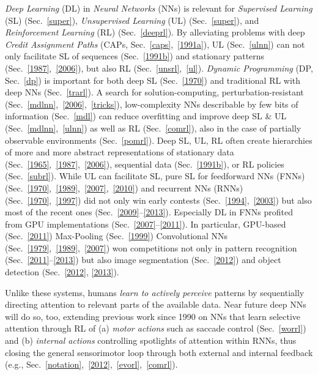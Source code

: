\documentclass[letterpaper]{article}
\begin{document}
\begin{CJK*}{UTF8}{gbsn}
{\em Deep Learning} (DL) in 
{\em Neural Networks} (NNs)
is relevant for
{\em Supervised Learning} (SL) (Sec.~\ref{super}),
{\em Unsupervised Learning} (UL) (Sec.~\ref{super}), and
{\em Reinforcement Learning} (RL) (Sec.~\ref{deeprl}).
By alleviating problems with deep {\em Credit Assignment Paths} (CAPs, Sec.~\ref{caps},~\ref{1991a}),
UL (Sec.~\ref{ulnn}) can not only facilitate 
SL of sequences  
(Sec.~\ref{1991b}) and 
stationary patterns
(Sec.~\ref{1987},~\ref{2006}), but also 
RL (Sec.~\ref{unsrl},~\ref{ul}). 
{\em Dynamic Programming} (DP, Sec.~\ref{dp}) is important for both 
deep SL (Sec.~\ref{1970})
and traditional RL with deep NNs (Sec.~\ref{trarl}).
A search for solution-computing, 
perturbation-resistant (Sec.~\ref{mdlnn},~\ref{2006},~\ref{tricks}),
low-complexity  NNs 
describable by few bits of information (Sec.~\ref{mdl}) can 
reduce overfitting and 
improve
deep SL \& UL (Sec.~\ref{mdlnn},~\ref{ulnn}) as well as RL (Sec.~\ref{comrl}),
also in the case of partially observable environments (Sec.~\ref{pomrl}). 
Deep SL, UL, RL often create hierarchies of more and more abstract  
representations of stationary data (Sec.~\ref{1965},~\ref{1987},~\ref{2006}),
sequential data (Sec.~\ref{1991b}), or RL policies (Sec.~\ref{subrl}). 
While UL can facilitate SL, pure SL for feedforward NNs (FNNs) (Sec.~\ref{1970},~\ref{1989},~\ref{2007},~\ref{2010})
and recurrent NNs (RNNs) (Sec.~\ref{1970},~\ref{1997})
did not only win early contests (Sec.~\ref{1994},~\ref{2003}) but also
most of the recent ones   
(Sec.~\ref{2009}--\ref{2013}).
Especially DL in FNNs profited from 
GPU implementations (Sec.~\ref{2007}--\ref{2011}).
In particular, 
GPU-based (Sec.~\ref{2011}) Max-Pooling (Sec.~\ref{1999}) Convolutional NNs (Sec.~\ref{1979},~\ref{1989},~\ref{2007})
won competitions not only in pattern recognition (Sec.~\ref{2011}--\ref{2013}) 
but also
image segmentation (Sec.~\ref{2012})
and object detection (Sec.~\ref{2012}, \ref{2013}).

Unlike these systems, humans {\em learn to actively perceive} patterns by sequentially directing attention to relevant parts of the available data. Near future deep NNs will do so, too, extending previous work since 1990 on NNs that learn selective attention through RL of (a) {\em motor actions} such as saccade control (Sec.~\ref{worrl}) and (b)  {\em internal actions} controlling spotlights of attention within RNNs, thus closing the general sensorimotor loop through both external and internal feedback (e.g., Sec.~\ref{notation},~\ref{2012},~\ref{evorl},~\ref{comrl}).


\end{CJK*}
\end{document}
